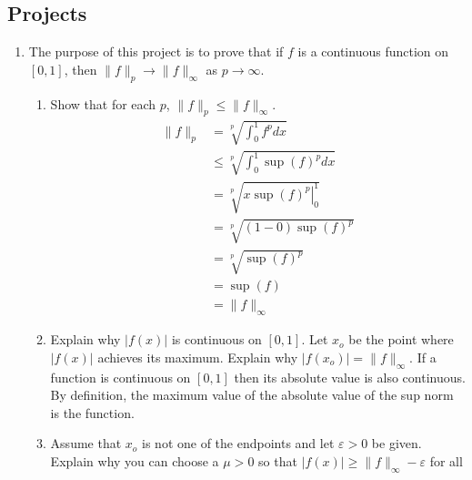 \documentclass{article}
\begin{document}
\subsection*{Projects}
\begin{enumerate}
      \item The purpose of this project is to prove that if $f$ is a continuous
            function on $[0,1]$, then $\lVert f\rVert_p\to\lVert f\rVert_\infty$
            as $p\to \infty$.
            \begin{enumerate}
                  \item Show that for each $p$,
                        $\lVert f\rVert_p\leq\lVert f\rVert_\infty$.
                        \begin{align*}
                              \lVert f\rVert_p & = \sqrt[p]{\int_0^1f^pdx}                     \\
                                               & \leq \sqrt[p]{\int_0^1\sup(f)^pdx}            \\
                                               & = \sqrt[p]{\left. x\sup(f)^p\right\rvert_0^1} \\
                                               & = \sqrt[p]{(1-0)\sup(f)^p}                    \\
                                               & = \sqrt[p]{\sup(f)^p}                         \\
                                               & = \sup(f)                                     \\
                                               & = \lVert f\rVert_\infty
                        \end{align*}
                  \item Explain why $\lvert f(x)\rvert$ is continuous on
                        $[0,1]$. Let $x_o$ be the point where
                        $\lvert f(x)\rvert$ achieves its maximum. Explain why
                        $\lvert f(x_o)\rvert=\lVert f\rVert_\infty$.
                        \medbreak
                        If a function is continuous on $[0,1]$ then its absolute
                        value is also continuous. By definition, the maximum value
                        of the absolute value of the sup norm is the function.
                  \item Assume that $x_o$ is not one of the endpoints and let
                        $\varepsilon>0$ be given. Explain why you can choose
                        a $\mu>0$ so that
                        $\lvert f(x)\rvert\geq\lVert f\rVert_\infty - \varepsilon$ for all

\end{enumerate}
\end{enumerate}
\end{document}
